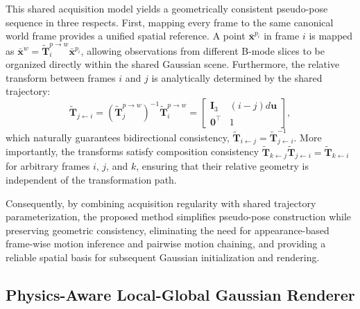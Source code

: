 This shared acquisition model yields a geometrically consistent pseudo-pose
sequence in three respects.
First, mapping every frame to the same canonical world frame provides a unified
spatial reference. A point $\bar{\mathbf x}^{p_i}$ in frame $i$ is mapped as
$\bar{\mathbf x}^{w}
=
\widetilde{\mathbf T}_i^{p\rightarrow w}\bar{\mathbf x}^{p_i}$,
allowing observations from different B-mode slices to be organized directly
within the shared Gaussian scene.
Furthermore, the relative transform between frames $i$ and $j$ is analytically
determined by the shared trajectory:
\begin{equation}
\widetilde{\mathbf T}_{j\leftarrow i}
=
\left(
\widetilde{\mathbf T}_j^{p\rightarrow w}
\right)^{-1}
\widetilde{\mathbf T}_i^{p\rightarrow w}
=
\begin{bmatrix}
\mathbf I_3 & (i-j)d\mathbf u\\
\mathbf 0^\top & 1
\end{bmatrix},
\label{eq:pseudo-pose-relative}
\end{equation}
which naturally guarantees bidirectional consistency,
$\widetilde{\mathbf T}_{i\leftarrow j}
=
\widetilde{\mathbf T}_{j\leftarrow i}^{-1}$.
More importantly, the transforms satisfy composition consistency
$\widetilde{\mathbf T}_{k\leftarrow j}
\widetilde{\mathbf T}_{j\leftarrow i}
=
\widetilde{\mathbf T}_{k\leftarrow i}$
for arbitrary frames $i$, $j$, and $k$, ensuring that their relative geometry
is independent of the transformation path. 

Consequently, by combining acquisition regularity with shared trajectory
parameterization, the proposed method simplifies pseudo-pose construction
while preserving geometric consistency, eliminating the need for
appearance-based frame-wise motion inference and pairwise motion chaining, and
providing a reliable spatial basis for subsequent Gaussian initialization and
rendering.

\vspace{-2mm}
\subsection{Physics-Aware Local-Global Gaussian Renderer}
\label{sec:physics-aware-local-global-gaussian-renderer}

